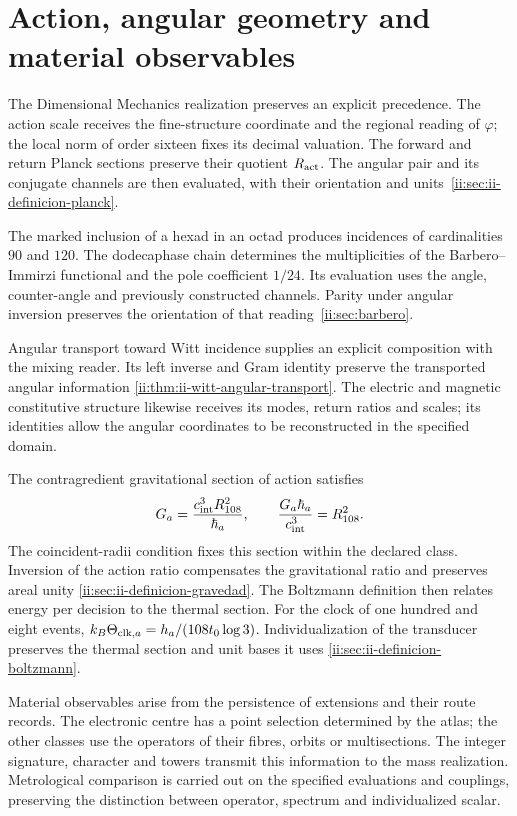 \section{Action, angular geometry and material observables}

The Dimensional Mechanics realization preserves an explicit precedence. The action scale receives the fine-structure coordinate and the regional reading of \(\varphi\); the local norm of order sixteen fixes its decimal valuation. The forward and return Planck sections preserve their quotient \(R_{\rm act}\). The angular pair and its conjugate channels are then evaluated, with their orientation and units~\ref{ii:sec:ii-definicion-planck}.

The marked inclusion of a hexad in an octad produces incidences of cardinalities \(90\) and \(120\). The dodecaphase chain determines the multiplicities of the Barbero--Immirzi functional and the pole coefficient \(1/24\). Its evaluation uses the angle, counter-angle and previously constructed channels. Parity under angular inversion preserves the orientation of that reading~\ref{ii:sec:barbero}.

Angular transport toward Witt incidence supplies an explicit composition with the mixing reader. Its left inverse and Gram identity preserve the transported angular information \ref{ii:thm:ii-witt-angular-transport}. The electric and magnetic constitutive structure likewise receives its modes, return ratios and scales; its identities allow the angular coordinates to be reconstructed in the specified domain.

The contragredient gravitational section of action satisfies
\[
 G_a=\frac{c_{\rm int}^{3}R_{108}^{2}}{\hbar_a},
 \qquad
 \frac{G_a\hbar_a}{c_{\rm int}^{3}}=R_{108}^{2}.
\]
The coincident-radii condition fixes this section within the declared class. Inversion of the action ratio compensates the gravitational ratio and preserves areal unity \ref{ii:sec:ii-definicion-gravedad}. The Boltzmann definition then relates energy per decision to the thermal section. For the clock of one hundred and eight events, \(k_B\Theta_{{\rm clk},a}=h_a/(108t_0\log3)\). Individualization of the transducer preserves the thermal section and unit bases it uses \ref{ii:sec:ii-definicion-boltzmann}.

Material observables arise from the persistence of extensions and their route records. The electronic centre has a point selection determined by the atlas; the other classes use the operators of their fibres, orbits or multisections. The integer signature, character and towers transmit this information to the mass realization. Metrological comparison is carried out on the specified evaluations and couplings, preserving the distinction between operator, spectrum and individualized scalar.

